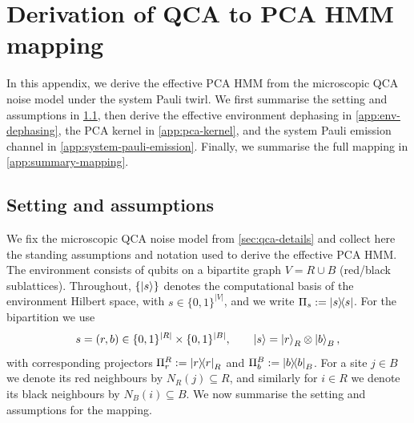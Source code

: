 \section{Derivation of QCA to PCA HMM mapping}\label{app:qca-pca-mapping}
In this appendix, we derive the effective PCA HMM from the microscopic QCA noise model under the system Pauli twirl. We first summarise the setting and assumptions in \cref{app:assumptions}, then derive the effective environment dephasing in \cref{app:env-dephasing}, the PCA kernel in \cref{app:pca-kernel}, and the system Pauli emission channel in \cref{app:system-pauli-emission}. Finally, we summarise the full mapping in \cref{app:summary-mapping}.

\subsection{Setting and assumptions}\label{app:assumptions}
We fix the microscopic QCA noise model from \cref{sec:qca-details} and collect here the
standing assumptions and notation used to derive the effective PCA HMM.
The environment consists of qubits on a bipartite graph \(V = R \cup B\) (red/black sublattices). Throughout, \(\{\ket{s}\}\) denotes the computational basis of the environment Hilbert space, with
\(s\in\{0,1\}^{|V|}\), and we write \(\Pi_s := \ket{s}\!\!\bra{s}\).
For the bipartition we use
\begin{equation}
s=(r,b)\in \{0,1\}^{|R|}\times\{0,1\}^{|B|},\qquad \ket{s}=\ket{r}_R\otimes\ket{b}_B,
\end{equation}
with corresponding projectors \(\Pi_r^R:=\ket{r}\!\!\bra{r}_R\) and \(\Pi_b^B:=\ket{b}\!\!\bra{b}_B\).
For a site \(j\in B\) we denote its red neighbours by \(N_R(j)\subseteq R\), and similarly
for \(i\in R\) we denote its black neighbours by \(N_B(i)\subseteq B\). We now summarise the setting and assumptions for the mapping.


